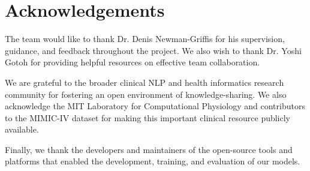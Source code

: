 \chapter{Acknowledgements}

The team would like to thank Dr. Denis Newman-Griffis for his supervision, guidance, and feedback throughout the project. We also wish to thank Dr. Yoshi Gotoh for providing helpful resources on effective team collaboration. \medskip

We are grateful to the broader clinical NLP and health informatics research community for fostering an open environment of knowledge-sharing. We also acknowledge the MIT Laboratory for Computational Physiology and contributors to the MIMIC-IV dataset for making this important clinical resource publicly available.\medskip

Finally, we thank the developers and maintainers of the open-source tools and platforms that enabled the development, training, and evaluation of our models.